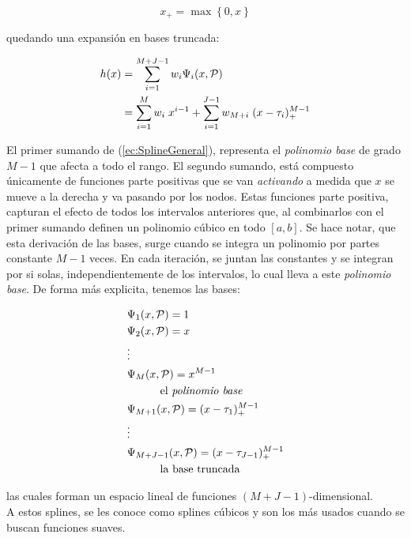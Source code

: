 \documentclass[../Main/Main.tex]{subfiles}
\begin{document}
$$  x_+ = \max\left\{0,x\right\} $$

quedando una expansión en bases truncada:

\begin{align}
	h(x) &= \sum_{i = 1}^{M + J - 1} w_i \Psi_i(x,\mathcal{P}) \nonumber \\ 
 		 &=	\sum_{i = 1}^M w_i \; x^{i-1} + \sum_{i = 1}^{J-1}w_{M+i}\;(x - \tau_i)_+^{M-1}	\label{ec:SplineGeneral}
\end{align}

El primer sumando de (\ref{ec:SplineGeneral}), representa el \textit{polinomio base} de grado $M-1$ %
que afecta a todo el rango. El segundo sumando, está compuesto únicamente de funciones parte positivas que se van \textit{activando} a medida que $x$ se mueve a la derecha y va pasando por los nodos. Estas funciones parte positiva, capturan el efecto de todos los intervalos anteriores que, al combinarlos con el primer sumando definen un polinomio cúbico en todo $[a,b]$. Se hace notar, que esta derivación de las bases, surge cuando se integra un polinomio por partes constante $M-1$ veces. En cada iteración, se juntan las constantes y se integran por si solas, independientemente de los intervalos, lo cual lleva a este \textit{polinomio base}. De forma más explicita, tenemos las bases:

\begin{align*}
	&\Psi_1(x,\mathcal{P}) = 1 \\ 
	&\Psi_2(x,\mathcal{P}) = x \\ 
	& \vdots \\
	&\Psi_M(x,\mathcal{P}) = x^{M-1}\\
	& \quad \quad \quad \text{el \textit{polinomio base}}\\				
	&\Psi_{M + 1}(x,\mathcal{P}) = (x - \tau_1)_+^{M-1} \\				
	& \vdots \\
	&\Psi_{M + J - 1}(x,\mathcal{P}) = (x - \tau_{J - 1})_+^{M-1} \\
	& \quad \quad \quad \text{la base truncada}		 
\end{align*}

las cuales forman un espacio lineal de funciones $(M + J - 1)$-dimensional.\\

A estos splines, se les conoce como splines cúbicos y son los más usados cuando se buscan funciones suaves.\\ 
\end{document}
